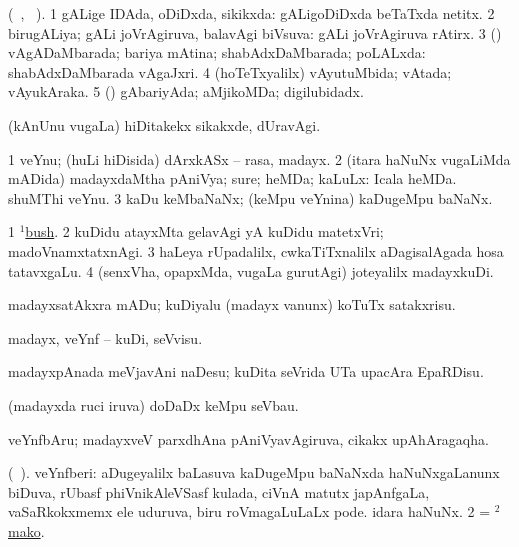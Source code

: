 \bentry 
{}
\gl{\gu} (\tara\ , \tama\ ).
\bmng
\bnum
\num{1} gALige IDAda, oDiDxda, sikikxda:  gALigoDiDxda beTaTxda netitx. 
\num{2} birugALiya; gALi joVrAgiruva, balavAgi biVsuva:  gALi joVrAgiruva rAtirx. 
\num{3} (\AmA) vAgADaMbarada; bariya mAtina; shabAdxDaMbarada; poLALxda:  shabAdxDaMbarada vAgaJxri. 
\num{4} (hoTeTxyalilx) vAyutuMbida; vAtada; vAyukAraka. 
\num{5} (\AmA) gAbariyAda; aMjikoMDa; digilubidadx. 
\enum
\emng

\noindent
\gl{\pagu}
\bmng
{} (kAnUnu \mo vugaLa) hiDitakekx sikakxde, dUravAgi. 
\emng
\eentry

\bentry
{} 
\gl{\nA}
\expl{}
\bmng
\bnum
\num{1} veYnu; (huLi hiDisida) dArxkASx -- rasa, madayx. 
\num{2} (itara haNuNx \mo vugaLiMda mADida) madayxdaMtha pAniVya; sure; heMDa; kaLuLx:  Icala heMDa.  shuMThi veYnu. 
\num{3} kaDu keMbaNaNx; (keMpu veYnina) kaDugeMpu baNaNx. 
\enum
\emng

\noindent
\gl{\pagu}
\bmng
\bnum
\num{1}  \hyperref{kandict_b.pdf}{B}{bush(1) nuga(3)}{$^1$bush}. 
\num{2}  kuDidu atayxMta gelavAgi yA kuDidu matetxVri; madoVnamxtatxnAgi. 
\num{3}  haLeya rUpadalilx, cwkaTiTxnalilx aDagisalAgada hosa tatavxgaLu. 
\num{4}  (senxVha, opapxMda, \mo vugaLa gurutAgi) joteyalilx madayxkuDi. 
\enum
\emng
\eentry

\bentry
{}
\gl{\sakirx}
\expl{}
\bmng
madayxsatAkxra mADu; kuDiyalu (madayx \mo vanunx) koTuTx satakxrisu. 
\emng

\noindent 
\gl{\akirx}
\expl{}
\bmng
madayx, veYnf -- kuDi, seVvisu. 
\emng

\noindent 
\gl{\pagu}
\bmng
{} madayxpAnada meVjavAni naDesu; kuDita seVrida UTa upacAra EpaRDisu. 
\emng
\eentry

\bentry 
{}
\gl{\nA}
\bmng
(madayxda ruci iruva) doDaDx keMpu seVbau. 
\emng
\eentry

\bentry
{}
\gl{\nA}
\bmng
veYnfbAru; madayxveV parxdhAna pAniVyavAgiruva, cikakx upAhAragaqha. 
\emng
\eentry

\bentry
{}
\gl{\nA} (\bava\ ).
\bmng
\bnum
{} veYnfberi: 
\banum
{} aDugeyalilx baLasuva kaDugeMpu baNaNxda haNuNxgaLanunx biDuva, rUbasf phiVnikAleVSasf kulada, ciVnA matutx japAnfgaLa, vaSaRkokxmemx ele uduruva, biru roVmagaLuLaLx pode. 
 idara haNuNx. 
\eanum
\numie
\num{2} = \hyperref{kandict_m.pdf}{M}{mako(2)}{$^2$mako}. 
\enum
\emng
\eentry

